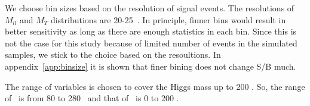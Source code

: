 We choose bin sizes based on the resolution of signal events. 
The resolutions of $M_{ll}$ and $M_T$ distributions are 20-25~\GeV.    
In principle, finner bins would result in better sensitivity
as long as there are enough statistics in each bin.
Since this is not the case for this study because of limited number of events
in the simulated samples, we stick to the choice based on the resoultions. 
In appendix~\ref{app:binsize} it is shown that finer bining does not change S/B much. 

The range of variables is chosen to cover the Higgs mass up to 200 \GeV.
So, the range of \mt~is from 80 to 280 \GeV~and that of \mll~is 0 to 200 \GeV. 
